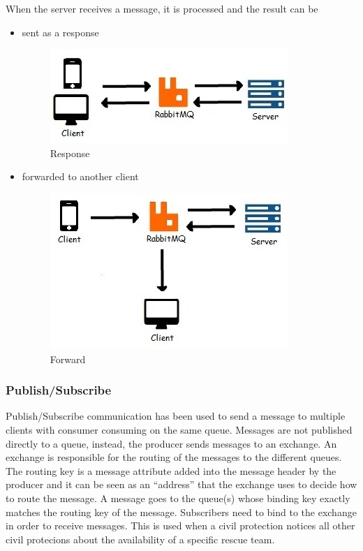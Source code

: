 \documentclass[a4paper,12pt]{report}
\begin{document}
When the server receives a message, it is processed and the result can be 
\begin{itemize}
\item sent as a response 
\begin{figure}[ht]
\centering
\includegraphics{figures/RPC.jpg}
\caption{Response}
\label{fig:RPC}
\end{figure}
\item forwarded to another client
\begin{figure}[ht]
\centering
\includegraphics{figures/forward.jpg}
\caption{Forward}
\label{fig:forward}
\end{figure}
\end{itemize}

\subsubsection{Publish/Subscribe}
Publish/Subscribe communication has been used to send a message to multiple clients with consumer consuming on the same queue. 
Messages are not published directly to a queue, instead, the producer sends messages to an exchange.
An exchange is responsible for the routing of the messages to the different queues. 
The routing key is a message attribute added into the message header by the producer and it can be seen as an ``address'' that the exchange uses to decide how to route the message. 
A message goes to the queue(s) whose binding key exactly matches the routing key of the message.
Subscribers need to bind to the exchange in order to receive messages.
This is used when a civil protection notices all other civil protecions about the availability of a specific rescue team.
\end{document}
